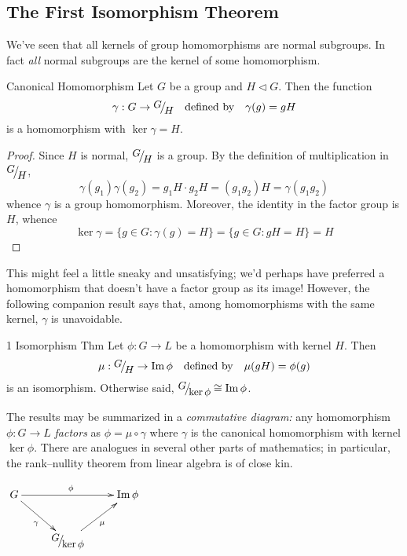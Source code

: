 \clearpage


\subsection{The First Isomorphism Theorem}\label{sec:1stiso}

We've seen that all kernels of group homomorphisms are normal subgroups. In fact \emph{all} normal subgroups are the kernel of some homomorphism.

\begin{thm}{Canonical Homomorphism}{}
Let $G$ be a group and $H\triangleleft G$. Then the function
\[\gamma:G\to \quotient GH\quad\text{defined by}\quad \gamma(g)=gH\]
is a homomorphism with $\ker\gamma=H$.
\end{thm}

\begin{proof}
Since $H$ is normal, $\quotient GH$ is a group. By the definition of multiplication in $\quotient GH$,
\[\gamma(g_1)\gamma(g_2)=g_1H\cdot g_2H=(g_1g_2)H=\gamma(g_1g_2)\]
whence $\gamma$ is a group homomorphism. Moreover, the identity in the factor group is $H$, whence
  \[\ker\gamma=\{g\in G:\gamma(g)=H\} =\{g\in G:gH=H\}=H\tag*{\qedhere}\]
\end{proof}

This might feel a little sneaky and unsatisfying; we'd perhaps have preferred a homomorphism that doesn't have a factor group as its image! However, the following companion result says that, among homomorphisms with the same kernel, $\gamma$ is unavoidable.

\begin{thm}{1\st{} Isomorphism Thm}{}
Let $\phi:G\to L$ be a homomorphism with kernel $H$. Then
\[\mu:\quotient GH\to\image\phi\quad \text{defined by}\quad \mu(gH)=\phi(g)\]
is an isomorphism. Otherwise said, $\quotient G{\ker\phi}\cong\image\phi$.
\end{thm}


\begin{minipage}[t]{0.65\linewidth}
The results may be summarized in a \emph{commutative diagram:} any homomorphism $\phi:G\to L$ \emph{factors} as $\phi=\mu\circ\gamma$ where $\gamma$ is the canonical homomorphism with kernel $\ker\phi$. There are analogues in several other parts of mathematics; in particular, the rank--nullity theorem from linear algebra is of close kin.
\end{minipage}\hfill\begin{minipage}[t]{0.3\linewidth}
\flushright$\xymatrix{G \ar[rr]^{\phi} \ar[dr]_\gamma && \image\phi\\
& \quotient G{\ker\phi} \ar[ur]_{\mu} &}$
\end{minipage}



